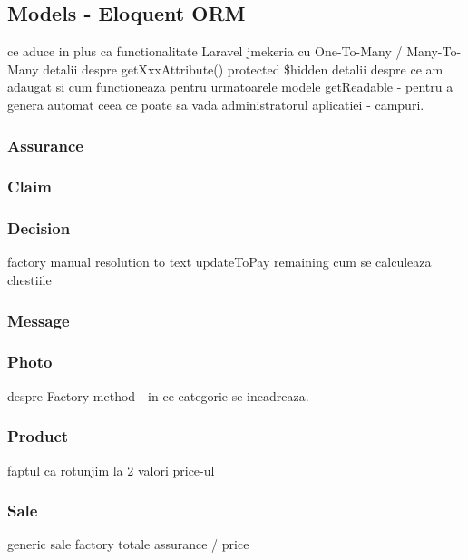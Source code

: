\subsection{Models - Eloquent ORM}
	ce aduce in plus ca functionalitate Laravel
	jmekeria cu One-To-Many / Many-To-Many
	detalii despre getXxxAttribute()
	protected \$hidden
	detalii despre ce am adaugat si cum functioneaza pentru urmatoarele modele
	getReadable - pentru a genera automat ceea ce poate sa vada administratorul aplicatiei - campuri.
	\subsubsection{Assurance}
	\subsubsection{Claim}
	\subsubsection{Decision}
		factory manual
		resolution to text
		updateToPay
		remaining
		cum se calculeaza chestiile
	\subsubsection{Message}
	\subsubsection{Photo}
		despre Factory method - in ce categorie se incadreaza.
	\subsubsection{Product}
		faptul ca rotunjim la 2 valori price-ul
	\subsubsection{Sale}
		generic sale factory
		totale assurance / price
